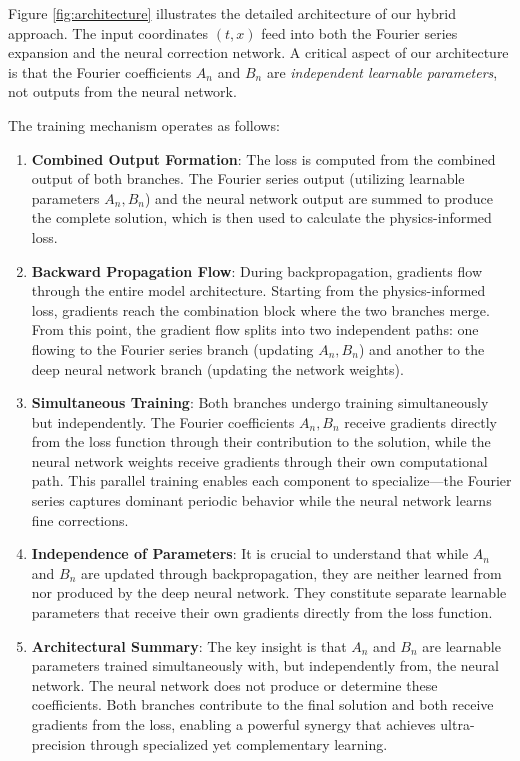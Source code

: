 Figure \ref{fig:architecture} illustrates the detailed architecture of our hybrid approach. The input coordinates $(t,x)$ feed into both the Fourier series expansion and the neural correction network. A critical aspect of our architecture is that the Fourier coefficients $A_n$ and $B_n$ are \textit{independent learnable parameters}, not outputs from the neural network. 

The training mechanism operates as follows:
\begin{enumerate}
    \item \textbf{Combined Output Formation}: The loss is computed from the combined output of both branches. The Fourier series output (utilizing learnable parameters $A_n, B_n$) and the neural network output are summed to produce the complete solution, which is then used to calculate the physics-informed loss.
    
    \item \textbf{Backward Propagation Flow}: During backpropagation, gradients flow through the entire model architecture. Starting from the physics-informed loss, gradients reach the combination block where the two branches merge. From this point, the gradient flow splits into two independent paths: one flowing to the Fourier series branch (updating $A_n, B_n$) and another to the deep neural network branch (updating the network weights).
    
    \item \textbf{Simultaneous Training}: Both branches undergo training simultaneously but independently. The Fourier coefficients $A_n, B_n$ receive gradients directly from the loss function through their contribution to the solution, while the neural network weights receive gradients through their own computational path. This parallel training enables each component to specialize—the Fourier series captures dominant periodic behavior while the neural network learns fine corrections.
    
    \item \textbf{Independence of Parameters}: It is crucial to understand that while $A_n$ and $B_n$ are updated through backpropagation, they are neither learned from nor produced by the deep neural network. They constitute separate learnable parameters that receive their own gradients directly from the loss function.
    
    \item \textbf{Architectural Summary}: The key insight is that $A_n$ and $B_n$ are learnable parameters trained simultaneously with, but independently from, the neural network. The neural network does not produce or determine these coefficients. Both branches contribute to the final solution and both receive gradients from the loss, enabling a powerful synergy that achieves ultra-precision through specialized yet complementary learning.
\end{enumerate}

